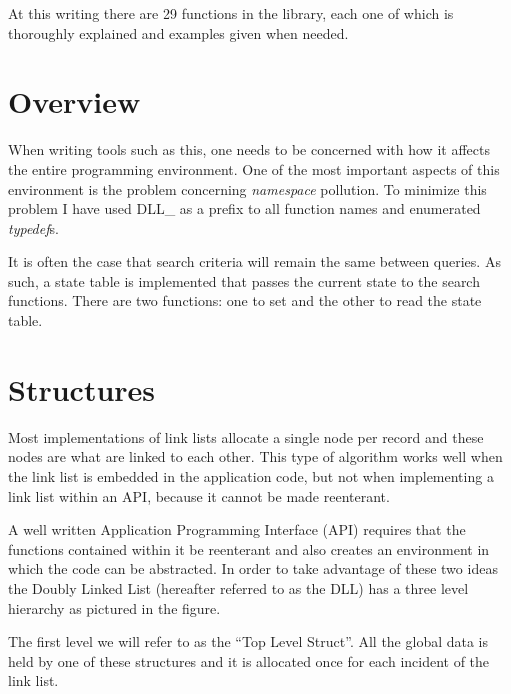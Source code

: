 \documentclass[10pt,letterpaper,titlepage]{article}
\begin{document}
\noindent
At this writing there are 29 functions in the library, each one of which is thoroughly explained and examples given when needed.
\newpage

\section{Overview}
When writing tools such as this, one needs to be concerned with how it affects the entire programming environment.  One of the most important aspects of this environment is the problem concerning \emph{namespace} pollution.  To minimize this problem I have used DLL\_ as a prefix to all function names and enumerated \emph{typedef}s.
\vspace{8pt}

\noindent
It is often the case that search criteria will remain the same between queries.  As such, a state table is implemented that passes the current state to the search functions.  There are two functions: one to set and the other to read the state table.
\newpage

\section{Structures}
Most implementations of link lists allocate a single node per record and these nodes are what are linked to each other.  This type of algorithm works well when the link list is embedded in the application code, but not when implementing a link list within an API, because it cannot be made reenterant.
\vspace{8pt}

\noindent
A well written Application Programming Interface (API) requires that the functions contained within it be reenterant and also creates an environment in which the code can be abstracted.  In order to take advantage of these two ideas the Doubly Linked List (hereafter referred to as the DLL) has a three level hierarchy as pictured in the figure.
\vspace{8pt}

\noindent
The first level we will refer to as the ``Top Level Struct''.  All the global data is held by one of these structures and it is allocated once for each incident of the link list.  
\end{document}
